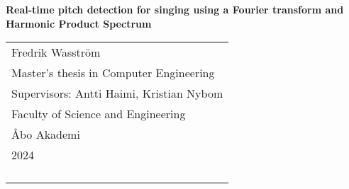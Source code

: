 
\begin{titlepage}
\vspace*{144pt}
\begin{center}
\Huge\bf Real-time pitch detection for singing using a Fourier transform and Harmonic Product Spectrum
\end{center}
\enlargethispage{3cm}
\vfill

\hfill
\begin{tabular}[t]{l@{}}%
Fredrik Wasström\\ 
Master's thesis in Computer Engineering\\ 
Supervisors: Antti Haimi, Kristian Nybom \\
Faculty of Science and Engineering \\
Åbo Akademi\\ 
2024\\ 
\\
\\
\\
\\
\end{tabular}
\end{titlepage}

